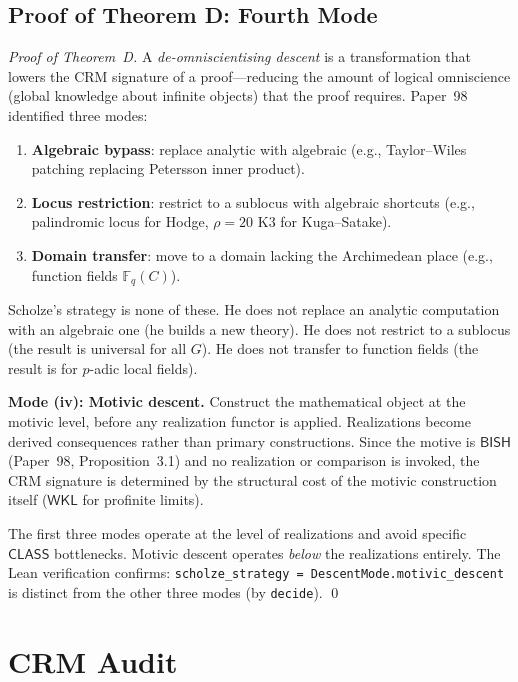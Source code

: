\documentclass[11pt,a4paper]{article}
\theoremstyle{plain}
\theoremstyle{definition}
\newcommand{\BISH}{\textsf{BISH}}
\newcommand{\WKL}{\textsf{WKL}}
\newcommand{\CLASS}{\textsf{CLASS}}
\newcommand{\F}{\mathbb{F}}
\begin{document}
\subsection{Proof of Theorem D: Fourth Mode}\label{sec:thmD}

\begin{proof}[Proof of Theorem~D]
A \emph{de-omniscientising descent} is a transformation that lowers the CRM signature of a proof---reducing the amount of logical omniscience (global knowledge about infinite objects) that the proof requires. Paper~98~\cite{lee-p98} identified three modes:
\begin{enumerate}[label=(\roman*)]
\item \textbf{Algebraic bypass}: replace analytic with algebraic (e.g., Taylor--Wiles patching replacing Petersson inner product).
\item \textbf{Locus restriction}: restrict to a sublocus with algebraic shortcuts (e.g., palindromic locus for Hodge, $\rho=20$ K3 for Kuga--Satake).
\item \textbf{Domain transfer}: move to a domain lacking the Archimedean place (e.g., function fields $\F_q(C)$).
\end{enumerate}

Scholze's strategy is none of these. He does not replace an analytic computation with an algebraic one (he builds a new theory). He does not restrict to a sublocus (the result is universal for all $G$). He does not transfer to function fields (the result is for $p$-adic local fields).

\textbf{Mode (iv): Motivic descent.} Construct the mathematical object at the motivic level, before any realization functor is applied. Realizations become derived consequences rather than primary constructions. Since the motive is $\BISH$ (Paper~98, Proposition~3.1) and no realization or comparison is invoked, the CRM signature is determined by the structural cost of the motivic construction itself ($\WKL$ for profinite limits).

The first three modes operate at the level of realizations and avoid specific $\CLASS$ bottlenecks. Motivic descent operates \emph{below} the realizations entirely. The Lean verification confirms: \texttt{scholze\_strategy = DescentMode.motivic\_descent} is distinct from the other three modes (by \texttt{decide}). \qed
\end{proof}


\section{CRM Audit}\label{sec:audit}
\end{document}
